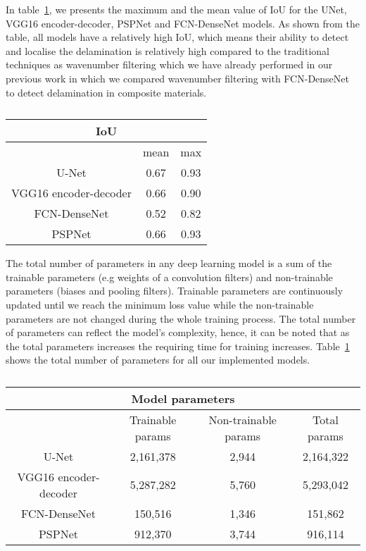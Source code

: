 In table~\ref{tab:table_iou}, we presents the maximum and the mean value of IoU for the UNet, VGG16 encoder-decoder, PSPNet and FCN-DenseNet models.
As shown from the table, all models have a relatively high IoU, which means their ability to detect and localise the delamination is relatively high compared to the traditional techniques as wavenumber filtering which we have already performed in our previous work in which we compared wavenumber filtering with FCN-DenseNet to detect delamination in composite materials.
\begin{table}[]
	\centering
	\caption{}
	\label{tab:table_iou}
	\begin{tabular}{ccc}
		\multicolumn{3}{c}{IoU} \\ \hline
		& mean & max \\ \hline
		U-Net & 0.67 & 0.93 \\ \hline
		VGG16 encoder-decoder & 0.66 & 0.90 \\ \hline
		FCN-DenseNet & 0.52 & 0.82 \\ \hline
		PSPNet & 0.66 & 0.93 \\ \hline
	\end{tabular}
\end{table}

The total number of parameters in any deep learning model is a sum of the trainable parameters (e.g weights of a convolution filters) and non-trainable parameters (biases and  pooling filters).
Trainable parameters are continuously updated until we reach the minimum loss value while the non-trainable parameters are not changed during the whole training process.
The total number of parameters can reflect the model's complexity, hence, it can be noted that as the total parameters increases the requiring time for training increases.
Table~\ref{tab:table_iou} shows the total number of parameters for all our implemented models.
\begin{table}[]
	\centering
	\caption{}
	\label{tab:table_parameters}
	\resizebox{\textwidth}{!}
	{
		\begin{tabular}{cccc}
			\multicolumn{4}{c}{Model parameters} \\ \hline
			& Trainable params & Non-trainable params & Total params \\ \hline
			U-Net & 2,161,378 & 2,944 & 2,164,322 \\ \hline
			VGG16 encoder-decoder & 5,287,282 & 5,760 & 5,293,042 \\ \hline
			FCN-DenseNet & 150,516 & 1,346 & 151,862 \\ \hline
			PSPNet & 912,370 & 3,744 & 916,114 \\ \hline
		\end{tabular}
	}
\end{table}
